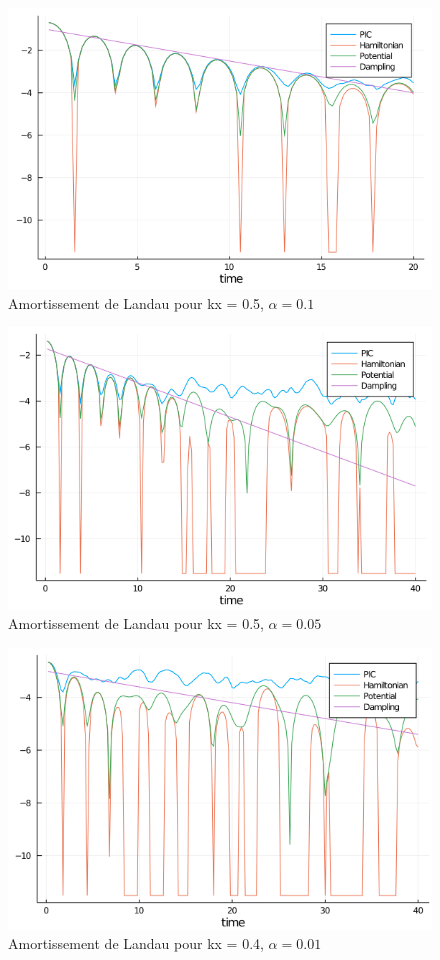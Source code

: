 \documentclass[a4paper,11pt]{article}
\begin{document}
\begin{figure}
	\centering
	\caption{Amortissement de Landau pour kx = 0.5, $\alpha = 0.1$}
	\label{amort2}
	\includegraphics[width=\textwidth]{fig/kx=0.5, alpha=0.1, it=100, dampling.png}
\end{figure}

\begin{figure}
	\centering
	\caption{Amortissement de Landau pour kx = 0.5, $\alpha = 0.05$}
	\label{amort}
	\includegraphics[width=\textwidth]{fig/kx=0.5, alpha=0.05, it=200, dampling.png}
\end{figure}

\begin{figure}
	\centering
	\caption{Amortissement de Landau pour kx = 0.4, $\alpha = 0.01$}
	\label{amort3}
	\includegraphics[width=\textwidth]{fig/kx=0.4, alpha=0.01, it=200, dampling.png}
\end{figure}
\end{document}
